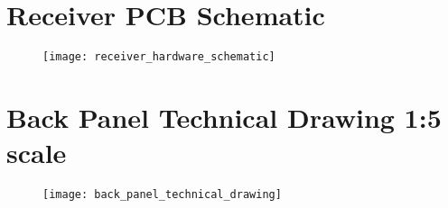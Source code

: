 \documentclass [12pt]{article}
\begin{document}
\section{Receiver PCB Schematic}\label{app:receiver_hardware_schematic}
\begin{figure}[H]
\centerline{\texttt{[image: receiver\_hardware\_schematic]}}
\end{figure}

\section{Back Panel Technical Drawing 1:5 scale}\label{app:back_panel_technical_drawing}
\begin{figure}[H]
\centerline{\texttt{[image: back\_panel\_technical\_drawing]}}
\end{figure}
\end{document}
